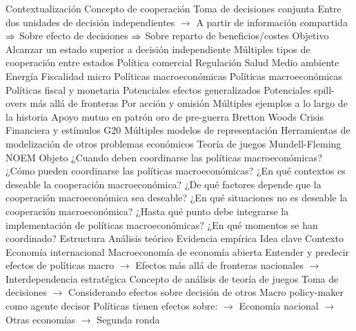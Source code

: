 \documentclass{nuevotema}
\begin{document}
\esquemalargo












\begin{esquemal}
	\1[] 
		\2 Contextualización
			\3 Concepto de cooperación
				\4 Toma de decisiones conjunta
				\4[] Entre dos unidades de decisión independientes
				\4[] $\to$ A partir de información compartida
				\4[] $\Rightarrow$ Sobre efecto de decisiones
				\4[] $\Rightarrow$ Sobre reparto de beneficios/costes
				\4 Objetivo
				\4[] Alcanzar un estado superior a decisión independiente
			\3 Múltiples tipos de cooperación entre estados
				\4 Política comercial
				\4 Regulación
				\4 Salud
				\4 Medio ambiente
				\4 Energía
				\4 Fiscalidad micro
				\4 Políticas macroeconómicas
			\3 Políticas macroeconómicas
				\4 Políticas fiscal y monetaria
				\4 Potenciales efectos generalizados
				\4 Potenciales spill-overs más allá de fronteras
				\4[] Por acción y omisión
			\3 Múltiples ejemplos a lo largo de la historia
				\4 Apoyo mutuo en patrón oro de pre-guerra
				\4 Bretton Woods
				\4 Crisis Financiera y estímulos G20
			\3 Múltiples modelos de representación
				\4 Herramientas de modelización de otros problemas económicos
				\4 Teoría de juegos
				\4 Mundell-Fleming
				\4 NOEM
		\2 Objeto
			\3 ¿Cuando deben coordinarse las políticas macroeconómicas?
			\3 ¿Cómo pueden coordinarse las políticas macroeconómicas?
			\3 ¿En qué contextos es deseable la cooperación macroeconómica?
			\3 ¿De qué factores depende que la cooperación macroeconómica sea deseable?
			\3 ¿En qué situaciones no es deseable la cooperación macroeconómica?
			\3 ¿Hasta qué punto debe integrarse la implementación de políticas macroeconómicas?
			\3 ¿En qué momentos se han coordinado?
		\2 Estructura
			\3 Análisis teórico
			\3 Evidencia empírica
	\1 \marcar{Análisis teórico}
		\2 Idea clave
			\3 Contexto
				\4 Economía internacional
				\4[]
				\4 Macroeconomía de economía abierta
				\4[] Entender y predecir efectos de políticas macro
				\4[] $\to$ Efectos más allá de fronteras nacionales
				\4[] $\to$
				\4 Interdependencia estratégica
				\4[] Concepto de análisis de teoría de juegos
				\4[] Toma de decisiones
				\4[] $\to$ Considerando efectos sobre decisión de otros
				\4 Macro policy-maker como agente decisor
				\4[] Políticas tienen efectos sobre:
				\4[] $\to$ Economía nacional
				\4[] $\to$ Otras economías
				\4[] $\to$ Segunda ronda

\end{esquemal}
\end{document}
